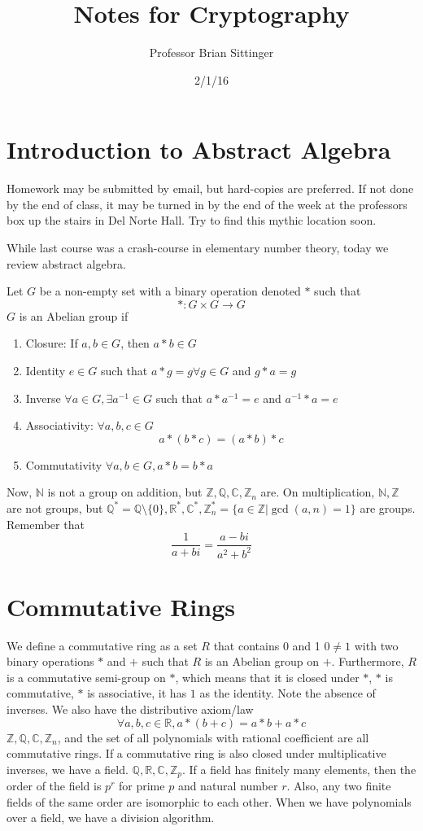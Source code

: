 \documentclass{article}
\title{Notes for Cryptography}
\author{Professor Brian Sittinger}
\date{2/1/16}
\begin{document}
\maketitle
\section{Introduction to Abstract Algebra}
Homework may be submitted by email, but hard-copies are preferred. If not done
by the end of class, it may be turned in by the end of the week at the
professors box up the stairs in Del Norte Hall. Try to find this mythic location
soon.

While last course was a crash-course in elementary number theory, today we
review abstract algebra. 

Let $G$ be a non-empty set with a binary operation denoted $*$ such that
\[ *:G \times G \rightarrow G \]
$G$
is an Abelian group if
\begin{enumerate}
\item Closure: If $a,b \in G$, then $a*b \in G$
\item Identity $e \in G$ such that $a * g = g \forall g \in G$ and $g * a =
g$
\item Inverse $\forall a \in G, \exists a^{-1} \in G$ such that $a*a^{-1} = e$
and $a^{-1} * a = e$
\item Associativity: $\forall a, b, c \in G$ 
\[ a * ( b * c ) = (a * b) * c \]
\item Commutativity $\forall a, b \in G, a * b = b * a $
\end{enumerate}
Now, $\mathbb{N}$ is not a group on addition, but $\mathbb{Z},
\mathbb{Q},\mathbb{C},\mathbb{Z}_n$ are. On multiplication, $\mathbb{N},
\mathbb{Z}$ are not groups, but $\mathbb{Q}^* = \mathbb{Q}\setminus \{0\},
\mathbb{R}^*, \mathbb{C}^*, \mathbb{Z}_{n}^*=\{a \in \mathbb{Z} | \gcd(a,n) = 1
\}$ are groups. Remember that
\[ \frac{1}{a + bi} = \frac{a - bi}{a^2 + b^2} \]

\section{Commutative Rings}
We define a commutative ring as a set $R$ that contains 0 and 1 $0 \neq 1$ with
two binary operations $*$ and $+$ such that $R$ is an Abelian group on $+$.
Furthermore, $R$ is a commutative semi-group on $*$, which means that it is
closed under $*$, $*$ is commutative, $*$ is associative, it has $1$ as the
identity. Note the absence of inverses. We also have the distributive axiom/law 
\[ \forall a,b,c \in \mathbb{R}, a*(b + c) = a*b + a * c \]
$\mathbb{Z}, \mathbb{Q}, \mathbb{C}, \mathbb{Z}_n$, and the set of all
polynomials with rational coefficient are all commutative rings. If
a commutative ring is also closed under multiplicative inverses, we have a field.
$\mathbb{Q}, \mathbb{R}, \mathbb{C}, \mathbb{Z}_p$. If a field has finitely many
elements, then the order of the field is $p^r$ for prime $p$ and natural number
$r$. Also, any two finite fields of the same order are isomorphic to each other.
When we have polynomials over a field, we have a division algorithm. 
\end{document}
